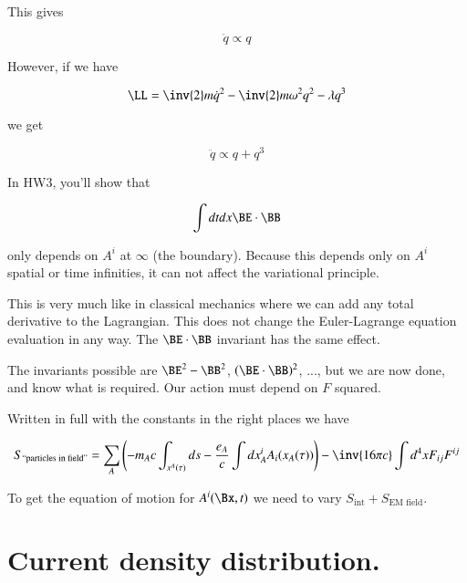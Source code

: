 This gives 

\begin{equation}\label{eqn:relativisticElectrodynamicsL12:290}
\ddot{q} \propto q
\end{equation}

However, if we have

\begin{equation}\label{eqn:relativisticElectrodynamicsL12:310}
\LL = \inv{2} m \dot{q}^2 - \inv{2} m \omega^2 q^2 - \lambda q^3
\end{equation}

we get

\begin{equation}\label{eqn:relativisticElectrodynamicsL12:330}
\ddot{q} \propto q + q^3
\end{equation}

In HW3, you'll show that 

\begin{equation}\label{eqn:relativisticElectrodynamicsL12:350}
\int dt dx \BE \cdot \BB
\end{equation}

only depends on $A^i$ at $\infty$ (the boundary).  Because this depends only on $A^i$ spatial or time infinities, it can not affect the variational principle.

This is very much like in classical mechanics where we can add any total derivative to the Lagrangian.  This does not change the Euler-Lagrange equation evaluation in any way.  The $\BE \cdot \BB$ invariant has the same effect.

The invariants possible are $\BE^2 - \BB^2$, $(\BE \cdot \BB)^2$, ..., but we are now done, and know what is required.  Our action must depend on $F$ squared.

Written in full with the constants in the right places we have

\begin{equation}\label{eqn:relativisticElectrodynamicsL12:370}
S_{\text{``particles in field''}}
= \sum_A \left( -m_A c \int_{x^A(\tau)} ds - \frac{e_A}{c} \int dx^i_A A_i(x_A(\tau))
\right)
- \inv{16 \pi c} \int d^4 x F_{ij} F^{ij}
\end{equation}

To get the equation of motion for $A^i(\Bx, t)$ we need to vary $S_{\text{int}} + S_{\text{EM field}}$.

\section{Current density distribution.}

